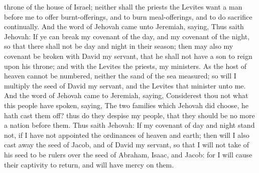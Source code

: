 throne of the house of Israel; neither shall the priests the Levites want a man before me to offer burnt-offerings, and to burn meal-offerings, and to do sacrifice continually.  And the word of Jehovah came unto Jeremiah, saying, Thus saith Jehovah: If ye can break my covenant of the day, and my covenant of the night, so that there shall not be day and night in their season; then may also my covenant be broken with David my servant, that he shall not have a son to reign upon his throne; and with the Levites the priests, my ministers. As the host of heaven cannot be numbered, neither the sand of the sea measured; so will I multiply the seed of David my servant, and the Levites that minister unto me.  And the word of Jehovah came to Jeremiah, saying, Considerest thou not what this people have spoken, saying, The two families which Jehovah did choose, he hath cast them off? thus do they despise my people, that they should be no more a nation before them. Thus saith Jehovah: If my covenant of day and night stand not, if I have not appointed the ordinances of heaven and earth; then will I also cast away the seed of Jacob, and of David my servant, so that I will not take of his seed to be rulers over the seed of Abraham, Isaac, and Jacob: for I will cause their captivity to return, and will have mercy on them. 

